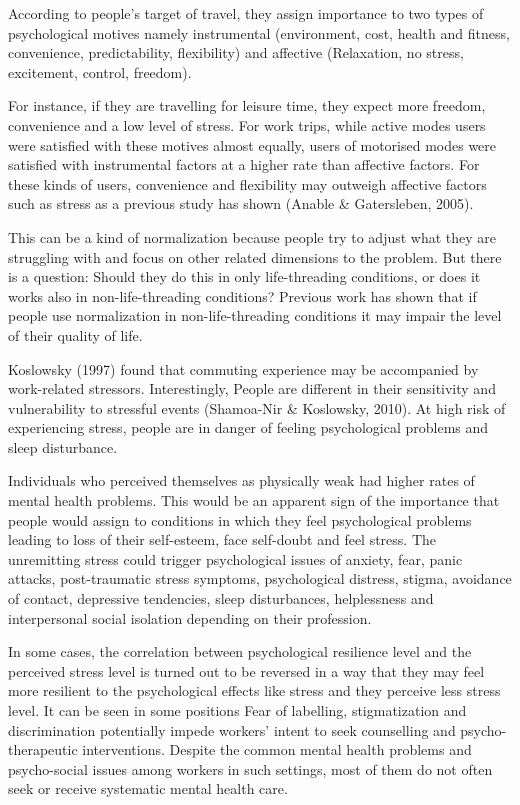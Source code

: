 \documentclass[
11pt, %
oneside, %
english, %
singlespacing, %
]{macthesis} %
\begin{document}
According to people's target of travel, they assign importance to two types of psychological motives namely instrumental (environment, cost, health and fitness, convenience, predictability, flexibility) and affective (Relaxation, no stress, excitement, control, freedom).

For instance, if they are travelling for leisure time, they expect more freedom, convenience and a low level of stress. For work trips, while active modes users were satisfied with these motives almost equally, users of motorised modes were satisfied with instrumental factors at a higher rate than affective factors. For these kinds of users, convenience and flexibility may outweigh affective factors such as stress as a previous study has shown (Anable \& Gatersleben, 2005).

This can be a kind of normalization because people try to adjust what they are struggling with and focus on other related dimensions to the problem. But there is a question: Should they do this in only life-threading conditions, or does it works also in non-life-threading conditions? Previous work has shown that if people use normalization in non-life-threading conditions it may impair the level of their quality of life.

Koslowsky (1997) found that commuting experience may be accompanied by work-related stressors. Interestingly, People are different in their sensitivity and vulnerability to stressful events (Shamoa-Nir \& Koslowsky, 2010). At high risk of experiencing stress, people are in danger of feeling psychological problems and sleep disturbance.

Individuals who perceived themselves as physically weak had higher rates of mental health problems. This would be an apparent sign of the importance that people would assign to conditions in which they feel psychological problems leading to loss of their self-esteem, face self-doubt and feel stress. The unremitting stress could trigger psychological issues of anxiety, fear, panic attacks, post-traumatic stress symptoms, psychological distress, stigma, avoidance of contact, depressive tendencies, sleep disturbances, helplessness and interpersonal social isolation depending on their profession.

In some cases, the correlation between psychological resilience level and the perceived stress level is turned out to be reversed in a way that they may feel more resilient to the psychological effects like stress and they perceive less stress level. It can be seen in some positions Fear of labelling, stigmatization and discrimination potentially impede workers' intent to seek counselling and psycho-therapeutic interventions. Despite the common mental health problems and psycho-social issues among workers in such settings, most of them do not often seek or receive systematic mental health care.
\end{document}
